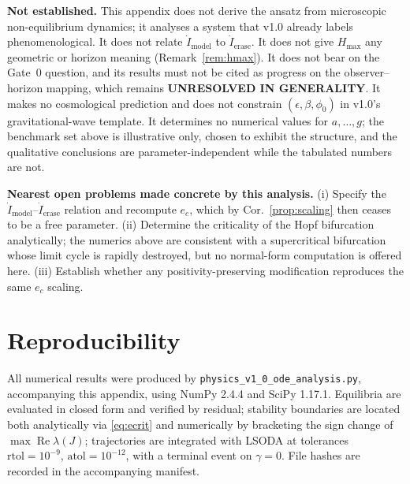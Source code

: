\documentclass[11pt,a4paper]{article}
\theoremstyle{definition}
\begin{document}
\medskip
\noindent\textbf{Not established.} This appendix does not derive the ansatz
from microscopic non-equilibrium dynamics; it analyses a system that v1.0
already labels phenomenological. It does not relate $\dot I_{\text{model}}$ to
$\dot I_{\text{erase}}$. It does not give $H_{\max}$ any geometric or horizon
meaning (Remark~\ref{rem:hmax}). It does not bear on the Gate~0 question, and
its results must not be cited as progress on the observer--horizon mapping,
which remains \textbf{UNRESOLVED IN GENERALITY}. It makes no cosmological
prediction and does not constrain $(\epsilon,\beta,\phi_0)$ in v1.0's
gravitational-wave template. It determines no numerical values for
$a,\dots,g$; the benchmark set above is illustrative only, chosen to exhibit
the structure, and the qualitative conclusions are parameter-independent while
the tabulated numbers are not.

\medskip
\noindent\textbf{Nearest open problems made concrete by this analysis.}
(i) Specify the $\dot I_{\text{model}}$--$\dot I_{\text{erase}}$ relation and
recompute $e_c$, which by Cor.~\ref{prop:scaling} then ceases to be a free
parameter. (ii) Determine the criticality of the Hopf bifurcation
analytically; the numerics above are consistent with a supercritical
bifurcation whose limit cycle is rapidly destroyed, but no normal-form
computation is offered here. (iii) Establish whether any positivity-preserving
modification reproduces the same $e_c$ scaling.

\section{Reproducibility}

All numerical results were produced by
\texttt{physics\_v1\_0\_ode\_analysis.py}, accompanying this appendix, using
NumPy 2.4.4 and SciPy 1.17.1. Equilibria are evaluated in closed form and
verified by residual; stability boundaries are located both analytically via
\eqref{eq:ecrit} and numerically by bracketing the sign change of
$\max\operatorname{Re}\lambda(J)$; trajectories are integrated with LSODA at
tolerances $\mathrm{rtol}=10^{-9}$, $\mathrm{atol}=10^{-12}$, with a
terminal event on $\gamma=0$. File hashes are recorded in the accompanying
manifest.
\end{document}
